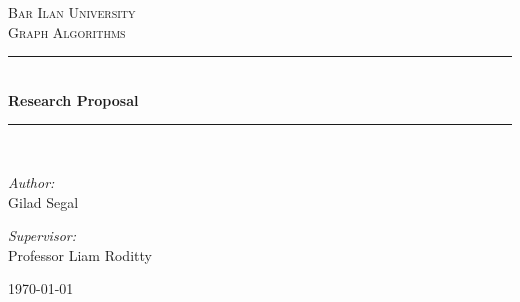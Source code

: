 \begin{titlepage}

  \newcommand{\HRule}{\rule{\linewidth}{0.5mm}} %

  \center %



  \textsc{\Large Bar Ilan University}\\[0.8cm] %
  \textsc{\large Graph Algorithms}\\[0.5cm] 

  
  

  \vspace{1.5 cm}
  \HRule \\[0.4cm]
  { \huge \bfseries Research Proposal}\\[0.4cm] %
  \HRule \\[1.5cm]
 

\begin{minipage}{0.46\textwidth}
\begin{flushleft} \large
\vspace{-0.6cm}	
\emph{Author:}\\	
Gilad Segal\\
\end{flushleft}								
\end{minipage}		
\begin{minipage}{0.52\textwidth}		
\vspace{-0.6cm}								
\begin{flushright} \large					
\emph{Supervisor:} \\						
Professor Liam Roditty\\
\end{flushright}					
\end{minipage}	


  \vspace{8 cm}
  {\large \today}\\[3cm] %


\vfill %

\end{titlepage}


\newpage